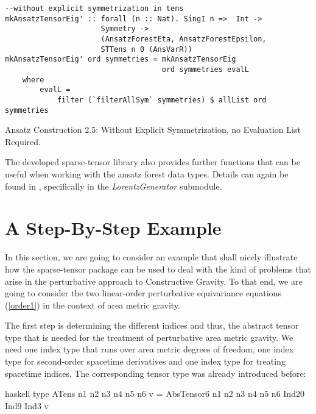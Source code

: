 \begin{listing}[hbt!]
\begin{verbatim}
--without explicit symmetrization in tens
mkAnsatzTensorEig' :: forall (n :: Nat). SingI n =>  Int ->
                      Symmetry ->
                      (AnsatzForestEta, AnsatzForestEpsilon,
                      STTens n 0 (AnsVarR))
mkAnsatzTensorEig' ord symmetries = mkAnsatzTensorEig
                                    ord symmetries evalL
    where
        evalL =
            filter (`filterAllSym` symmetries) $ allList ord symmetries
\end{verbatim} 
\caption{Ansatz Construction 2.5: Without Explicit Symmetrization, no Evaluation List Required.}\label{mkAnsatzEig2'}
\end{listing}

The developed sparse-tensor library also provides further functions that can be useful when working with the ansatz forest data types. Details can again be found in \cite{sparse-tensor}, specifically in the \textit{LorentzGenerator} submodule. 

\section{A Step-By-Step Example}
In this section, we are going to consider an example that shall nicely illustrate how the sparse-tensor package can be used to deal with the kind of problems that arise in the perturbative approach to Constructive Gravity. To that end, we are going to consider the two linear-order perturbative equivariance equations (\ref{order1}) in the context of area metric gravity. 

The first step is determining the different indices and thus, the abstract tensor type that is needed for the treatment of perturbative area metric gravity. 
We need one index type that runs over area metric degrees of freedom, one index type for second-order spacetime derivatives and one index type for treating spacetime indices. The corresponding tensor type was already introduced before:

\begin{center}
\begin{cminted}{haskell}
type ATens n1 n2 n3 n4 n5 n6 v = 
     AbsTensor6 n1 n2 n3 n4 n5 n6 Ind20 Ind9 Ind3 v
\end{cminted}
\end{center}

